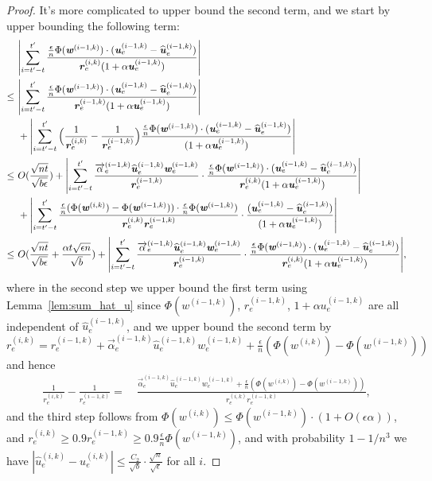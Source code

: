 \documentclass[11pt]{article}
\let\originalleft\left
\let\originalright\right
\renewcommand{\left}{\mathopen{}\mathclose\bgroup\originalleft}
\renewcommand{\right}{\aftergroup\egroup\originalright}
\newcommand\rr{\boldsymbol{\mathit{r}}}
\newcommand\uu{\boldsymbol{\mathit{u}}}
\newcommand\ww{\boldsymbol{\mathit{w}}}
\newcommand{\wh}{\widehat}
\begin{document}
\begin{proof}
It's more complicated to upper bound the second term, and we start by upper bounding the following term:
\begin{align}\label{eq:robust_stability_2_1}
&~ \left|\sum_{i = t'-t}^{t'} \frac{\frac{\epsilon}{n} \Phi(\ww^{(i-1,k)}) \cdot ( \uu_e^{(i-1,k)} - \wh{\uu}_e^{(i-1,k)})}{\rr_e^{(i,k)} (1 + \alpha \uu_e^{(i-1,k)})}\right| \notag \\
\leq &~ \left|\sum_{i = t'-t}^{t'} \frac{\frac{\epsilon}{n} \Phi(\ww^{(i-1,k)}) \cdot ( \uu_e^{(i-1,k)} - \wh{\uu}_e^{(i-1,k)})}{\rr_e^{(i-1,k)} (1 + \alpha \uu_e^{(i-1,k)})}\right|\notag \\
&~ + \left|\sum_{i = t'-t}^{t'}\Big(\frac{1}{\rr_e^{(i,k)}} - \frac{1}{\rr_e^{(i-1,k)}}\Big) \frac{\frac{\epsilon}{n} \Phi(\ww^{(i-1,k)}) \cdot ( \uu_e^{(i-1,k)} - \wh{\uu}_e^{(i-1,k)})}{ (1 + \alpha \uu_e^{(i-1,k)})}\right| \notag \\
\leq &~ O(\frac{\sqrt{nt}}{\sqrt{b \epsilon}}) + \left|\sum_{i = t'-t}^{t'}  \frac{\overrightarrow{\alpha}_e^{(i-1,k)} \wh{\uu}_e^{(i-1,k)} \ww_e^{(i-1,k)}}{\rr_e^{(i-1,k)}} \cdot \frac{\frac{\epsilon}{n} \Phi(\ww^{(i-1,k)}) \cdot (\uu_e^{(i-1,k)} - \wh{\uu}_e^{(i-1,k)})}{\rr_e^{(i,k)} (1 + \alpha \uu_e^{(i-1,k)})} \right| \notag \\ 
&~ + \left|\sum_{i = t'-t}^{t'}  \frac{\frac{\epsilon}{n} (\Phi(\ww^{(i,k)}) - \Phi(\ww^{(i-1,k)})) \cdot \frac{\epsilon}{n} \Phi(\ww^{(i-1,k)})}{\rr_e^{(i,k)} \rr_e^{(i-1,k)}} \cdot \frac{(\uu_e^{(i-1,k)} - \wh{\uu}_e^{(i-1,k)})}{(1 + \alpha \uu_e^{(i-1,k)})} \right| \notag \\
\leq &~ O(\frac{\sqrt{nt}}{\sqrt{b \epsilon}} + \frac{\alpha t \sqrt{\epsilon n}}{\sqrt{b}}) + \left|\sum_{i = t'-t}^{t'}  \frac{\overrightarrow{\alpha}_e^{(i-1,k)} \wh{\uu}_e^{(i-1,k)} \ww_e^{(i-1,k)}}{\rr_e^{(i-1,k)}} \cdot \frac{\frac{\epsilon}{n} \Phi(\ww^{(i-1,k)}) \cdot (\uu_e^{(i-1,k)} - \wh{\uu}_e^{(i-1,k)})}{\rr_e^{(i,k)} (1 + \alpha \uu_e^{(i-1,k)})} \right|,
\end{align}
where in the second step we upper bound the first term using Lemma~\ref{lem:sum_hat_u} since $\Phi(\ww^{(i-1,k)})$, $\rr_e^{(i-1,k)}$, $1+\alpha\uu_e^{(i-1,k)}$ are all independent of $\wh{\uu}_e^{(i-1,k)}$, and we upper bound the second term by $\rr_e^{(i,k)} = \rr_e^{(i-1,k)} + \overrightarrow{\alpha}_e^{(i-1,k)} \wh{\uu}_e^{(i-1,k)} \ww_e^{(i-1,k)} + \frac{\epsilon}{n} (\Phi(\ww^{(i,k)}) - \Phi(\ww^{(i-1,k)}))$ and hence
\begin{align*}
\frac{1}{\rr_e^{(i,k)}} - \frac{1}{\rr_e^{(i-1,k)}}
= &~ \frac{\overrightarrow{\alpha}_e^{(i-1,k)} \wh{\uu}_e^{(i-1,k)} \ww_e^{(i-1,k)} + \frac{\epsilon}{n} (\Phi(\ww^{(i,k)}) - \Phi(\ww^{(i-1,k)}))}{\rr_e^{(i,k)} \rr_e^{(i-1,k)}},
\end{align*}
and the third step follows from $\Phi(\ww^{(i,k)}) \leq \Phi(\ww^{(i-1,k)}) \cdot (1 + O(\epsilon \alpha))$, and $\rr_e^{(i,k)} \geq 0.9 \rr_e^{(i-1,k)} \geq 0.9 \frac{\epsilon}{n} \Phi(\ww^{(i-1,k)})$, and with probability $1-1/n^3$ we have $|\wh{\uu}^{(i,k)}_e - \uu^{(i,k)}_e| \leq \frac{C_2}{\sqrt{b}} \cdot \frac{\sqrt{n}}{\sqrt{\epsilon}}$ for all $i$.


\end{proof}
\end{document}
